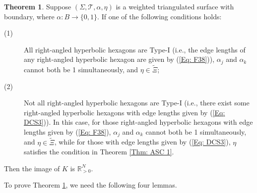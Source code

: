 \documentclass[12pt]{amsart}
\theoremstyle{definition}
\newtheorem{theorem}{Theorem}[section]
\begin{document}
\begin{theorem}\label{Thm: image 4}
Suppose $(\Sigma,\mathcal{T},\alpha,\eta)$ is a weighted triangulated surface with boundary, where $\alpha: B\rightarrow \{0,1\}$.
If one of the following conditions holds: 
\begin{description}
\item[(1)]
All right-angled hyperbolic hexagons are Type-I (i.e., the edge lengths of any right-angled hyperbolic hexagon are given by (\ref{Eq: F38})), $\alpha_j$ and $\alpha_k$ cannot both be 1 simultaneously, and $\eta\in \widetilde{\Xi}$;
\item[(2)]
Not all right-angled hyperbolic hexagons are Type-I (i.e., there exist some right-angled hyperbolic hexagons with edge lengths given by (\ref{Eq: DCS3})).
In this case, for those right-angled hyperbolic hexagons with edge lengths given by (\ref{Eq: F38}), $\alpha_j$ and $\alpha_k$ cannot both be 1 simultaneously, and $\eta\in \widetilde{\Xi}$,
while for those with edge lengths given by (\ref{Eq: DCS3}), $\eta$ satisfies the condition in Theorem \ref{Thm: ASC 1}.
\end{description}
Then the image of $K$ is $\mathbb{R}^N_{>0}$.
\end{theorem}

To prove Theorem \ref{Thm: image 4}, we need the following four lemmas.
\end{document}
